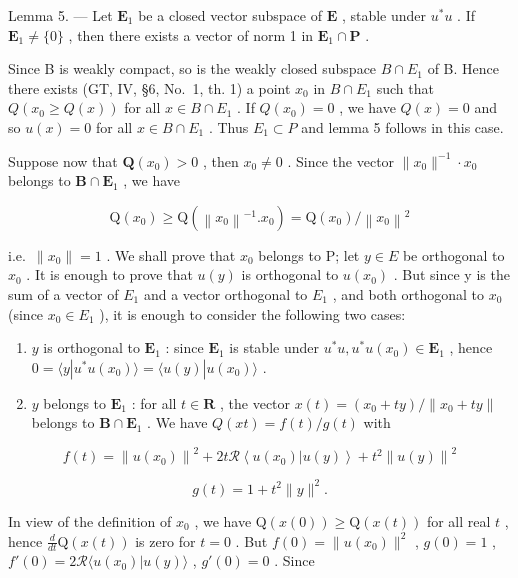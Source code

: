 Lemma 5. --- Let \(\mathbf{E}_1\) be a closed vector subspace of \(\mathbf{E}\) , stable under \(u^*u\) . If \(\mathbf{E}_1 \neq \{0\}\) , then there exists a vector of norm 1 in \(\mathbf{E}_1 \cap \mathbf{P}\) .

Since B is weakly compact, so is the weakly closed subspace \(B \cap E_{1}\) of B. Hence there exists (GT, IV, §6, No.~1, th. 1) a point \(x_{0}\) in \(B \cap E_{1}\) such that \(Q(x_{0} \geqslant Q(x))\) for all \(x \in B \cap E_{1}\) . If \(Q(x_{0}) = 0\) , we have \(Q(x) = 0\) and so \(u(x) = 0\) for all \(x \in B \cap E_{1}\) . Thus \(E_{1} \subset P\) and lemma 5 follows in this case.

Suppose now that \(\mathbf{Q}(x_0) > 0\) , then \(x_0 \neq 0\) . Since the vector \(\| x_0 \|^{-1} \cdot x_0\) belongs to \(\mathbf{B} \cap \mathbf{E}_1\) , we have

\[
\mathrm{Q} \left(x _ {0}\right) \geqslant \mathrm{Q} \left(\left\| x _ {0} \right\| ^ {- 1}. x _ {0}\right) = \mathrm{Q} \left(x _ {0}\right) / \left\| x _ {0} \right\| ^ {2}
\]

i.e.~\(\|x_{0}\|=1\) . We shall prove that \(x_{0}\) belongs to P; let \(y\in E\) be orthogonal to \(x_{0}\) . It is enough to prove that \(u(y)\) is orthogonal to \(u(x_{0})\) . But since y is the sum of a vector of \(E_{1}\) and a vector orthogonal to \(E_{1}\) , and both orthogonal to \(x_{0}\) (since \(x_{0}\in E_{1}\) ), it is enough to consider the following two cases:

\begin{enumerate}
\def\labelenumi{\alph{enumi})}
\item
  \(y\) is orthogonal to \(\mathbf{E}_1\) : since \(\mathbf{E}_1\) is stable under \(u^* u, u^* u(x_0) \in \mathbf{E}_1\) , hence \(0 = \langle y | u^* u(x_0) \rangle = \langle u(y) | u(x_0) \rangle\) .
\item
  \(y\) belongs to \(\mathbf{E}_1\) : for all \(t \in \mathbf{R}\) , the vector \(x(t) = (x_0 + ty) / \| x_0 + ty \|\) belongs to \(\mathbf{B} \cap \mathbf{E}_1\) . We have \(Q(xt) = f(t) / g(t)\) with
\end{enumerate}

\[
f (t) = \left\| u (x _ {0}) \right\| ^ {2} + 2 t \mathscr {R} \left\langle u (x _ {0}) | u (y) \right\rangle + t ^ {2} \left\| u (y) \right\| ^ {2}
\]

\[
g (t) = 1 + t ^ {2} \| y \| ^ {2}.
\]

In view of the definition of \(x_0\) , we have \(\mathrm{Q}(x(0)) \geqslant \mathrm{Q}(x(t))\) for all real \(t\) , hence \(\frac{d}{dt} \mathrm{Q}(x(t))\) is zero for \(t = 0\) . But \(f(0) = \| u(x_0)\|^2\) , \(g(0) = 1\) , \(f'(0) = 2\mathcal{R}\langle u(x_0)|u(y)\rangle\) , \(g'(0) = 0\) . Since

